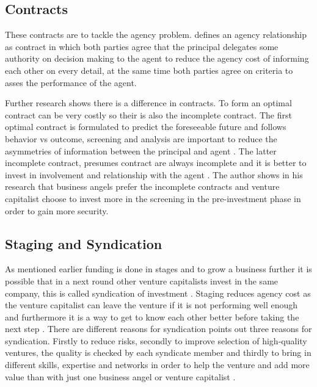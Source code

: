 \documentclass[a4paper, 11pt]{article}
\begin{document}
\subsection{Contracts}

These contracts are to tackle the agency problem. \cite{jensen1976theory} defines an agency relationship as contract in which both parties agree that the principal delegates some authority on decision making to the agent to reduce the agency cost of informing each other on every detail, at the same time both parties agree on criteria to asses the performance of the agent.

Further research shows there is a difference in contracts. To form an optimal contract can be very costly so their is also the incomplete contract. The first optimal contract is formulated to predict the foreseeable future and follows behavior vs outcome, screening and analysis are important to reduce the asymmetries of information between the principal and agent \citep{Osnabrugge2000}. The latter incomplete contract, presumes contract are always incomplete and it is better to invest in involvement and relationship with the agent  \citep{Osnabrugge2000}. The author shows in his research that business angels prefer the incomplete contracts and venture capitalist choose to invest more in the screening in the pre-investment phase in order to gain more security.



\subsection{Staging and Syndication}
As mentioned earlier funding is done in stages and to grow a business further it is possible that in a next round other venture capitalists invest in the same company, this is called syndication of investment \citep{casson2008oxford}. Staging reduces agency cost as the venture capitalist can leave the venture if it is not performing well enough and furthermore it is a way to get to know each other better before taking the next step \citep{colombo2016open}. There are different reasons for syndication  \cite{colombo2016open} points out three reasons for syndication. Firstly to reduce risks, secondly to improve selection of high-quality ventures, the quality is checked by each syndicate member and thirdly to bring in different skills, expertise and networks in order to help the venture and add more value than with just one business angel or venture capitalist \citep{colombo2016open}. 
\end{document}
